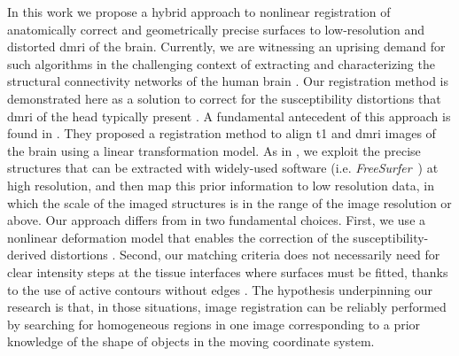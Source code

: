 In this work we propose a hybrid approach to nonlinear registration of anatomically correct
  and geometrically precise surfaces to low-resolution and distorted \gls*{dmri} of the brain.
Currently, we are witnessing an uprising demand for such algorithms in the challenging context
  of extracting and characterizing the structural connectivity networks of the
  human brain \citep{craddock_imaging_2013}.
Our registration method is demonstrated here as a solution to correct for the susceptibility
  distortions that \gls*{dmri} of the head typically present \cite{jezzard_correction_1995}.
A fundamental antecedent of this approach is found in \citep{greve_accurate_2009}.
They proposed a registration method to align \gls*{t1} and \gls*{dmri} images
  of the brain using a linear transformation model.
As in \citep{greve_accurate_2009}, we exploit the precise structures that can be extracted with
  widely-used software (i.e. \emph{FreeSurfer}~\citep{fischl_freesurfer_2012}) at high resolution,
  and then map this prior information to low resolution data, in which the scale of the imaged
  structures is in the range of the image resolution or above.
Our approach differs from \citep{greve_accurate_2009} in two fundamental choices.
First, we use a nonlinear deformation model that enables the correction of the
  susceptibility-derived distortions \citep{jezzard_correction_1995}.
Second, our matching criteria does not necessarily need for clear intensity
  steps at the tissue interfaces where surfaces must be fitted, thanks to the use of
  active contours without edges \cite{chan_active_2001}.
The hypothesis underpinning our research is that, in those situations,
  image registration can be reliably performed by searching for homogeneous
  regions in one image corresponding to a prior knowledge of the shape of objects in
  the moving coordinate system.
